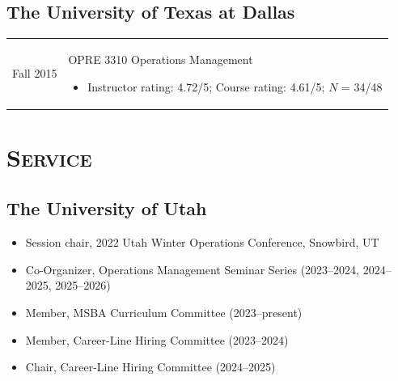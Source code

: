 \documentclass[11pt]{article}
\begin{document}
	\subsection*{The University of Texas at Dallas}
		\begin{longtable}{p{2.5cm}p{14cm}}
			Fall 2015  & OPRE 3310 Operations Management
			\begin{itemize}[label={$\circ\;$}]
				\item Instructor rating: 4.72/5; Course rating: 4.61/5; $N$ = 34/48
			\end{itemize}
		\end{longtable}


			\section*{\textbf{\textsc{Service}}}
			\subsection*{The University of Utah}
			\begin{itemize}
				\item Session chair, 2022 Utah Winter Operations Conference, Snowbird, UT
				\item Co-Organizer, Operations Management Seminar  Series (2023--2024, 2024--2025, 2025--2026)
				\item Member, MSBA Curriculum Committee (2023--present)
				\item Member, Career-Line Hiring Committee (2023--2024)
				\item Chair, Career-Line Hiring Committee (2024--2025)

			\end{itemize}
\end{document}
